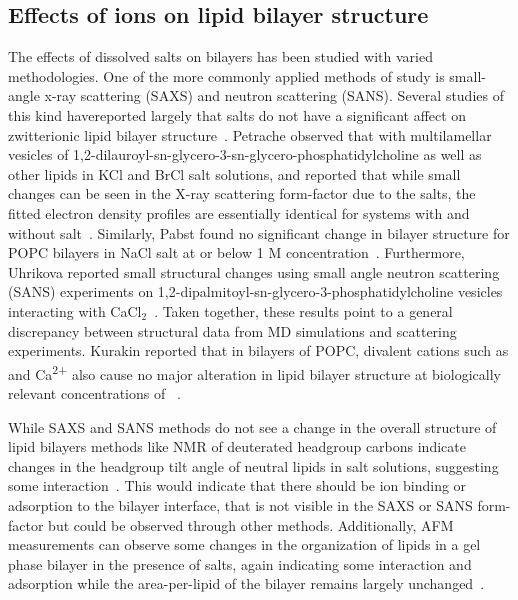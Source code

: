 \subsection{Effects of ions on lipid bilayer structure}
The effects of dissolved salts on bilayers has been studied with varied methodologies. 
One of the more commonly applied methods of study
is small-angle x-ray scattering (SAXS) and neutron scattering (SANS). 
Several studies of this kind havereported
largely that salts do not have a significant affect on zwitterionic lipid bilayer 
structure~\cite{pabst:2007,petrache:2006:swelling,uhrikova:2008,kurakin:2021:effect}.
Petrache \etal{} observed that with multilamellar vesicles of 1,2-dilauroyl-sn-glycero-3-sn-glycero-phosphatidylcholine 
as well as other lipids in KCl and BrCl salt solutions, 
and reported that while small changes can be seen in the
X-ray scattering form-factor due to the 
salts, 
the fitted electron density profiles are essentially identical for
systems with and without 
salt~\cite{petrache:2006:swelling}. 
Similarly, Pabst \etal{} found no significant change in bilayer structure 
for POPC bilayers in NaCl salt at or below 1 M concentration~\cite{pabst:2007}.
Furthermore, Uhrikova \etal{} reported small structural changes using small angle neutron scattering
(SANS) experiments on 1,2-dipalmitoyl-sn-glycero-3-phosphatidylcholine 
vesicles interacting with CaCl$_{2}$~\cite{uhrikova:2008}. 
Taken together, these results point to a general discrepancy between structural data 
from MD simulations and scattering experiments.
Kurakin \etal{} reported that in bilayers of POPC, divalent cations such as \mg{} and Ca\textsuperscript{2+} also cause
no major alteration in lipid bilayer structure at biologically relevant concentrations of \mg~\cite{kurakin:2021:effect}.

While SAXS and SANS methods do not see a change in the overall structure of lipid bilayers methods like NMR of deuterated headgroup carbons 
indicate changes in the headgroup tilt angle of neutral lipids in salt solutions, suggesting some interaction~\cite{akutsu:1981,seelig:1987}. 
This would indicate that there should be ion binding or adsorption to the bilayer interface, that is not visible in the SAXS or SANS form-factor but 
could be observed through other methods. Additionally, AFM measurements can observe some changes in the organization of lipids in a 
gel phase bilayer in the presence of salts, again indicating some interaction 
and adsorption while the area-per-lipid of the bilayer remains largely unchanged~\cite{ferber:2011:direct}.

